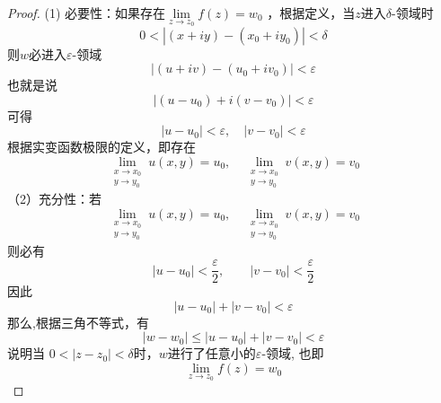 \begin{proof}
  (1) 必要性：如果存在$ \lim\limits_{z \to z_0} f(z) = w_0 $ ，根据定义，当$z$进入$\delta$-领域时 
  $$0<\left\vert (x+iy) - (x_0+iy_0)\right\vert < \delta$$
  则$w$必进入$\varepsilon$-领域
  $$\left\vert (u+iv) - (u_0+iv_0)\right\vert < \varepsilon$$
  也就是说
  $$\left\vert (u-u_0) + i(v-v_0)\right\vert < \varepsilon$$
  可得 
  $$\left\vert u-u_0\right\vert < \varepsilon,\quad \left\vert v-v_0\right\vert < \varepsilon$$
  根据实变函数极限的定义，即存在 
  \[ \lim _{\substack{x \rightarrow x_{0} \\ y \rightarrow y_{0}}} u(x, y)=u_{0}, \quad \lim _{\substack{x \rightarrow x_{0} \\ y \rightarrow y_{0}}} v(x, y)=v_{0}\]
  （2）充分性：若
  \[ \lim _{\substack{x \rightarrow x_{0} \\ y \rightarrow y_{0}}} u(x, y)=u_{0}, 
  \quad \lim _{\substack{x \rightarrow x_{0} \\ y \rightarrow y_{0}}} v(x, y)=v_{0}\]
  则必有$$ \left\vert u - u_0 \right\vert  < \dfrac{\varepsilon}{2},\qquad  \left\vert v - v_0 \right\vert  < \dfrac{\varepsilon}{2} $$
  因此 
  $$ \left\vert u - u_0 \right\vert  + \left\vert v - v_0 \right\vert  <  \varepsilon $$
  那么,根据三角不等式，有 
  \[ \left\vert w -  w_0   \right\vert  \le \left\vert u - u_0 \right\vert  +  \left\vert v - v_0 \right\vert < \varepsilon\]
  说明当 $0<\left\vert z- z_0 \right\vert < \delta$时，$w$进行了任意小的$\varepsilon$-领域, 也即
  \[ \lim\limits_{z \to z_0} f(z) = w_0 \]
\end{proof}

